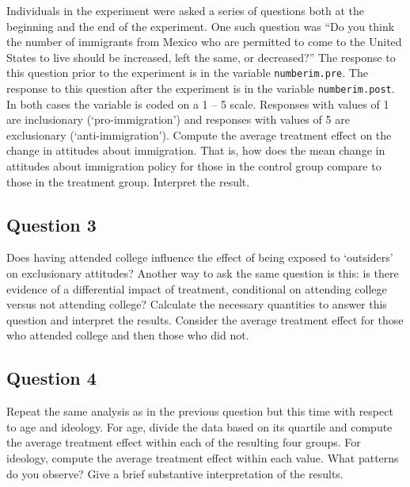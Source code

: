 \documentclass[]{article}
\begin{document}
Individuals in the experiment were asked a series of questions both at
the beginning and the end of the experiment. One such question was ``Do
you think the number of immigrants from Mexico who are permitted to come
to the United States to live should be increased, left the same, or
decreased?'' The response to this question prior to the experiment is in
the variable \texttt{numberim.pre}. The response to this question after
the experiment is in the variable \texttt{numberim.post}. In both cases
the variable is coded on a 1 -- 5 scale. Responses with values of 1 are
inclusionary (`pro-immigration') and responses with values of 5 are
exclusionary (`anti-immigration'). Compute the average treatment effect
on the change in attitudes about immigration. That is, how does the mean
change in attitudes about immigration policy for those in the control
group compare to those in the treatment group. Interpret the result.

\subsection{Question 3}\label{question-3}

Does having attended college influence the effect of being exposed to
`outsiders' on exclusionary attitudes? Another way to ask the same
question is this: is there evidence of a differential impact of
treatment, conditional on attending college versus not attending
college? Calculate the necessary quantities to answer this question and
interpret the results. Consider the average treatment effect for those
who attended college and then those who did not.

\subsection{Question 4}\label{question-4}

Repeat the same analysis as in the previous question but this time with
respect to age and ideology. For age, divide the data based on its
quartile and compute the average treatment effect within each of the
resulting four groups. For ideology, compute the average treatment
effect within each value. What patterns do you observe? Give a brief
substantive interpretation of the results.
\end{document}
